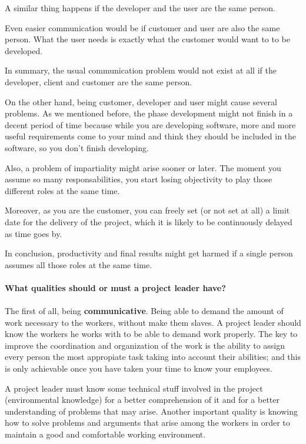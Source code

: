 \documentclass{article}
\begin{document}
A similar thing happens if the developer and the user are the same person. 

Even easier communication would be if customer and user are also the same person. What the user needs is exactly what the customer would want to to be developed.

In summary, the usual communication problem would not exist at all if the developer, client and customer are the same person.



On the other hand, being customer, developer and user might cause several problems. As we mentioned before, the phase development might not finish in a decent period of time because while you are developing software, more and more useful requirements come to your mind and think they should be included in the software, so you don't finish developing.

Also, a problem of impartiality might arise sooner or later. The moment you assume so many responsabilities, you start losing objectivity to play those different roles at the same time.

Moreover, as you are the customer, you can freely set (or not set at all) a limit date for the delivery of the project, which it is likely to be continuously delayed as time goes by.

In conclusion, productivity and final results might get harmed if a single person assumes all those roles at the same time.

\paragraph{What qualities should or must a project leader have?}
\paragraph{}
The first of all, being \textbf{communicative}. Being able to demand the amount of work necessary to the workers, without make them slaves. A project leader should know the workers he works with to be able to demand work properly. The key to improve the coordination and organization of the work is the ability to assign every person the most appropiate task taking into account their abilities; and this is only achievable once you have taken your time to know your employees.

A project leader must know some technical stuff involved in the project (environmental knowledge) for a better comprehension of it and for a better understanding of problems that may arise. Another important quality is knowing how to solve problems and arguments that arise among the workers in order to maintain a good and comfortable working environment.
\end{document}
